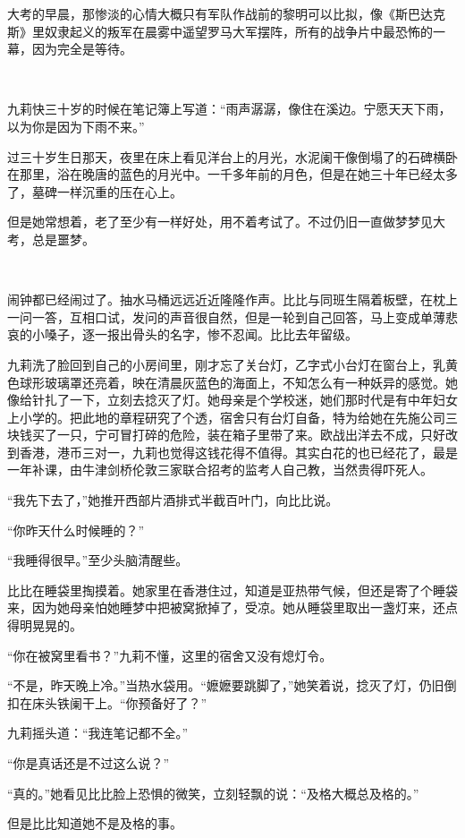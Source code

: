 \par 大考的早晨，那惨淡的心情大概只有军队作战前的黎明可以比拟，像《斯巴达克斯》里奴隶起义的叛军在晨雾中遥望罗马大军摆阵，所有的战争片中最恐怖的一幕，因为完全是等待。
\par  
\par 九莉快三十岁的时候在笔记簿上写道：“雨声潺潺，像住在溪边。宁愿天天下雨，以为你是因为下雨不来。”
\par 过三十岁生日那天，夜里在床上看见洋台上的月光，水泥阑干像倒塌了的石碑横卧在那里，浴在晚唐的蓝色的月光中。一千多年前的月色，但是在她三十年已经太多了，墓碑一样沉重的压在心上。
\par 但是她常想着，老了至少有一样好处，用不着考试了。不过仍旧一直做梦梦见大考，总是噩梦。
\par  
\par 闹钟都已经闹过了。抽水马桶远远近近隆隆作声。比比与同班生隔着板壁，在枕上一问一答，互相口试，发问的声音很自然，但是一轮到自己回答，马上变成单薄悲哀的小嗓子，逐一报出骨头的名字，惨不忍闻。比比去年留级。
\par 九莉洗了脸回到自己的小房间里，刚才忘了关台灯，乙字式小台灯在窗台上，乳黄色球形玻璃罩还亮着，映在清晨灰蓝色的海面上，不知怎么有一种妖异的感觉。她像给针扎了一下，立刻去捻灭了灯。她母亲是个学校迷，她们那时代是有中年妇女上小学的。把此地的章程研究了个透，宿舍只有台灯自备，特为给她在先施公司三块钱买了一只，宁可冒打碎的危险，装在箱子里带了来。欧战出洋去不成，只好改到香港，港币三对一，九莉也觉得这钱花得不值得。其实白花的也已经花了，最是一年补课，由牛津剑桥伦敦三家联合招考的监考人自己教，当然贵得吓死人。
\par “我先下去了，”她推开西部片酒排式半截百叶门，向比比说。
\par “你昨天什么时候睡的？”
\par “我睡得很早。”至少头脑清醒些。
\par 比比在睡袋里掏摸着。她家里在香港住过，知道是亚热带气候，但还是寄了个睡袋来，因为她母亲怕她睡梦中把被窝掀掉了，受凉。她从睡袋里取出一盏灯来，还点得明晃晃的。
\par “你在被窝里看书？”九莉不懂，这里的宿舍又没有熄灯令。
\par “不是，昨天晚上冷。”当热水袋用。“嬷嬷要跳脚了，”她笑着说，捻灭了灯，仍旧倒扣在床头铁阑干上。“你预备好了？”
\par 九莉摇头道：“我连笔记都不全。”
\par “你是真话还是不过这么说？”
\par “真的。”她看见比比脸上恐惧的微笑，立刻轻飘的说：“及格大概总及格的。”
\par 但是比比知道她不是及格的事。
